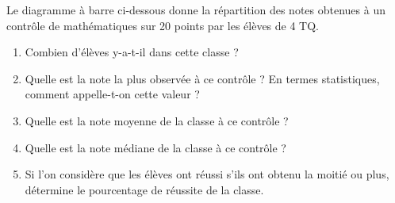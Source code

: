 %
%
    Le diagramme à barre ci-dessous donne la répartition des notes obtenues à un contrôle de mathématiques sur 20 points par les élèves de 4 TQ.
    \begin{center}
        
    \end{center}
    \begin{enumerate}
        \item Combien d'élèves y-a-t-il dans cette classe ?
        \item Quelle est la note la plus observée à ce contrôle ? En termes statistiques, comment appelle-t-on cette valeur ?
        \item Quelle est la note moyenne de la classe à ce contrôle ?
        \item Quelle est la note médiane de la classe à ce contrôle ?
        \item Si l'on considère que les élèves ont réussi s'ils ont obtenu la moitié ou plus, détermine le pourcentage de réussite de la classe.
    \end{enumerate}
